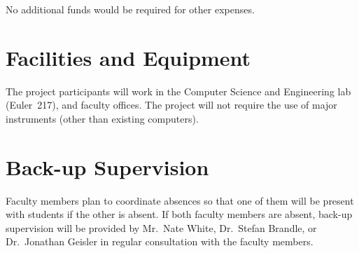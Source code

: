 \documentclass{article}
\begin{document}
No additional funds would be required for other expenses.

\section{Facilities and Equipment}
\label{sec:facilities-equipment}


The project participants will work in
the Computer Science and Engineering lab (Euler~217), and
faculty offices.
The project will not require the use of major instruments
(other than existing computers).

\section{Back-up Supervision}
\label{sec:back-up-supervision}


Faculty members plan to coordinate absences
so that one of them will be present with students if the other is absent.
If both faculty members are absent,
back-up supervision will be provided by
Mr.\ Nate White,
Dr.\ Stefan Brandle, or
Dr.\ Jonathan Geisler
in regular consultation with the faculty members.
\end{document}
